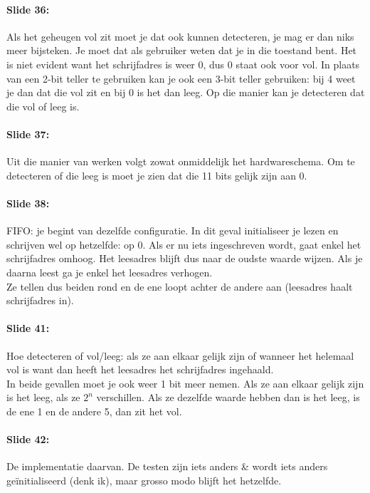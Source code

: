 \documentclass[10pt,a4paper]{book}
\begin{document}
\paragraph{Slide 36:} Als het geheugen vol zit moet je dat ook kunnen detecteren, je mag er dan niks meer bijsteken. Je moet dat als gebruiker weten dat je in die toestand bent. Het is niet evident want het schrijfadres is weer 0, dus 0 staat ook voor vol. In plaats van een 2-bit teller te gebruiken kan je ook een 3-bit teller gebruiken: bij 4 weet je dan dat die vol zit en bij 0 is het dan leeg. Op die manier kan je detecteren dat die vol of leeg is.

\paragraph{Slide 37:} Uit die manier van werken volgt zowat onmiddelijk het hardwareschema. Om te detecteren of die leeg is moet je zien dat die 11 bits gelijk zijn aan 0.

\paragraph{Slide 38:} FIFO: je begint van dezelfde configuratie. In dit geval initialiseer je lezen en schrijven wel op hetzelfde: op 0. Als er nu iets ingeschreven wordt, gaat enkel het schrijfadres omhoog. Het leesadres blijft dus naar de oudste waarde wijzen. Als je daarna leest ga je enkel het leesadres verhogen.\\
Ze tellen dus beiden rond en de ene loopt achter de andere aan (leesadres haalt schrijfadres in).

\paragraph{Slide 41:} Hoe detecteren of vol/leeg: als ze aan elkaar gelijk zijn of wanneer het helemaal vol is want dan heeft het leesadres het schrijfadres ingehaald.\\
In beide gevallen moet je ook weer 1 bit meer nemen. Als ze aan elkaar gelijk zijn is het leeg, als ze $2^n$ verschillen. Als ze dezelfde waarde hebben dan is het leeg, is de ene 1 en de andere 5, dan zit het vol.

\paragraph{Slide 42:} De implementatie daarvan. De testen zijn iets anders \& wordt iets anders ge\"initialiseerd (denk ik), maar grosso modo blijft het hetzelfde.
\end{document}
